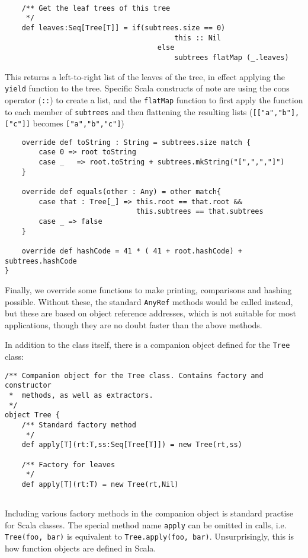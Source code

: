 \begin{verbatim}
    
    /** Get the leaf trees of this tree
     */
    def leaves:Seq[Tree[T]] = if(subtrees.size == 0)
                                        this :: Nil 
                                    else
                                        subtrees flatMap (_.leaves)
\end{verbatim}

This returns a left-to-right list of the leaves of the tree, in effect
applying the \texttt{yield} function to the tree. Specific Scala constructs
of note are using the cons operator (\texttt{::}) to create a list, and
the \texttt{flatMap} function to first apply the function to each member of
\texttt{subtrees} and then flattening the resulting lists
(\texttt{[["a","b"],["c"]]} becomes \texttt{["a","b","c"]})

\begin{verbatim}
    override def toString : String = subtrees.size match { 
        case 0 => root toString
        case _   => root.toString + subtrees.mkString("[",",","]") 
    }

    override def equals(other : Any) = other match{
        case that : Tree[_] => this.root == that.root &&
                               this.subtrees == that.subtrees
        case _ => false
    }

    override def hashCode = 41 * ( 41 + root.hashCode) + subtrees.hashCode
}
\end{verbatim}

Finally, we override some functions to make printing, comparisons and
hashing possible. Without these, the standard \texttt{AnyRef} methods would
be called instead, but these are based on object reference addresses, which
is not suitable for most applications, though they are no doubt faster than
the above methods. 

In addition to the class itself, there is a companion object defined for
the \texttt{Tree} class:
\begin{verbatim}
/** Companion object for the Tree class. Contains factory and constructor
 *  methods, as well as extractors.
 */
object Tree {
    /** Standard factory method
     */
    def apply[T](rt:T,ss:Seq[Tree[T]]) = new Tree(rt,ss)
    
    /** Factory for leaves
     */
    def apply[T](rt:T) = new Tree(rt,Nil)
    
\end{verbatim}

Including various factory methods in the companion object is standard
practise for Scala classes. The special method name \texttt{apply} can be
omitted in calls, i.e. \texttt{Tree(foo, bar)} is equivalent to
\texttt{Tree.apply(foo, bar)}. Unsurprisingly, this is how function objects
are defined in Scala. 

